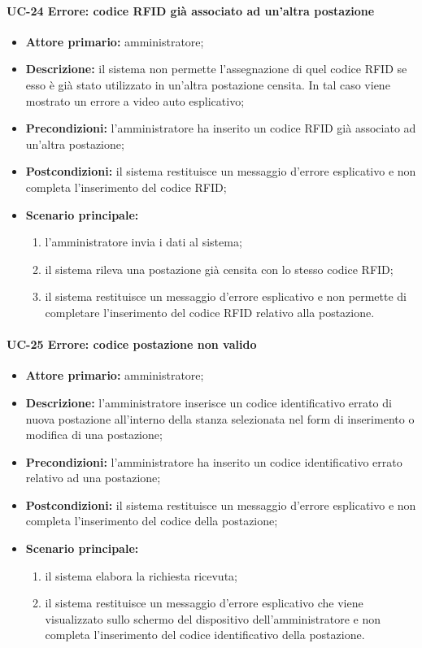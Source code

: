 \paragraph{UC-24 Errore: codice RFID già associato ad un'altra postazione}
    \begin{itemize}
	\item \textbf{Attore primario:} amministratore;
	\item \textbf{Descrizione:} il sistema non permette l'assegnazione di quel codice RFID se esso è già stato utilizzato in un'altra postazione censita. In tal caso viene mostrato un errore a video auto esplicativo;
	\item \textbf{Precondizioni:} l'amministratore ha inserito un codice RFID già associato ad un'altra postazione;
	\item \textbf{Postcondizioni:} il sistema restituisce un messaggio d'errore esplicativo e non completa l'inserimento del codice RFID;
	\item \textbf{Scenario principale:}
	      \begin{enumerate}
	      	      \item l'amministratore invia i dati al sistema;
		      \item il sistema rileva una postazione già censita con lo stesso codice RFID;
		      \item il sistema restituisce un messaggio d'errore esplicativo e non permette di completare l'inserimento del codice RFID relativo alla postazione.
	      \end{enumerate}
\end{itemize}


\paragraph{UC-25 Errore: codice postazione non valido}
\begin{itemize}
	\item \textbf{Attore primario:} amministratore;
	\item \textbf{Descrizione:} l'amministratore inserisce un codice identificativo errato di nuova postazione all'interno della stanza selezionata nel form di inserimento o modifica di una postazione;
	\item \textbf{Precondizioni:} l'amministratore ha inserito un codice identificativo errato relativo ad una postazione;
	\item \textbf{Postcondizioni:} il sistema restituisce un messaggio d'errore esplicativo e non completa l'inserimento del codice della postazione;
	\item \textbf{Scenario principale:}
	      \begin{enumerate}
		      \item il sistema elabora la richiesta ricevuta;
		      \item il sistema restituisce un messaggio d'errore esplicativo che viene visualizzato sullo schermo del dispositivo dell'amministratore e non completa l'inserimento del codice identificativo della postazione.
	      \end{enumerate}
\end {itemize}

